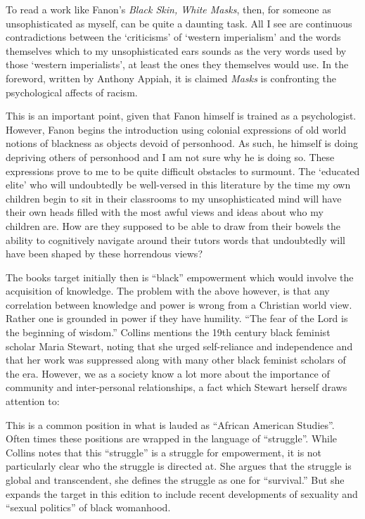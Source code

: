 \documentclass[
  letterpaper,
  DIV=11,
  numbers=noendperiod]{scrreprt}
\begin{document}
\begin{tcolorbox}[enhanced jigsaw, arc=.35mm, breakable, rightrule=.15mm, colback=white, colframe=quarto-callout-important-color-frame, bottomrule=.15mm, leftrule=.75mm, opacityback=0, toprule=.15mm, left=2mm]
\begin{tcolorbox}[enhanced jigsaw, arc=.35mm, breakable, rightrule=.15mm, colback=white, colframe=quarto-callout-tip-color-frame, bottomrule=.15mm, leftrule=.75mm, opacityback=0, toprule=.15mm, left=2mm]
To read a work like Fanon's \emph{Black Skin, White Masks}, then, for
someone as unsophisticated as myself, can be quite a daunting task. All
I see are continuous contradictions between the `criticisms' of `western
imperialism' and the words themselves which to my unsophisticated ears
sounds as the very words used by those `western imperialists', at least
the ones they themselves would use. In the foreword, written by Anthony
Appiah, it is claimed \emph{Masks} is confronting the psychological
affects of racism.

This is an important point, given that Fanon himself is trained as a
psychologist. However, Fanon begins the introduction using colonial
expressions of old world notions of blackness as objects devoid of
personhood. As such, he himself is doing depriving others of personhood
and I am not sure why he is doing so. These expressions prove to me to
be quite difficult obstacles to surmount. The `educated elite' who will
undoubtedly be well-versed in this literature by the time my own
children begin to sit in their classrooms to my unsophisticated mind
will have their own heads filled with the most awful views and ideas
about who my children are. How are they supposed to be able to draw from
their bowels the ability to cognitively navigate around their tutors
words that undoubtedly will have been shaped by these horrendous views?

The books target initially then is ``black'' empowerment which would
involve the acquisition of knowledge. The problem with the above
however, is that any correlation between knowledge and power is wrong
from a Christian world view. Rather one is grounded in power if they
have humility. ``The fear of the Lord is the beginning of wisdom.''
Collins mentions the 19th century black feminist scholar Maria Stewart,
noting that she urged self-reliance and independence and that her work
was suppressed along with many other black feminist scholars of the era.
However, we as a society know a lot more about the importance of
community and inter-personal relationships, a fact which Stewart herself
draws attention to:

This is a common position in what is lauded as ``African American
Studies''. Often times these positions are wrapped in the language of
``struggle''. While Collins notes that this ``struggle'' is a struggle
for empowerment, it is not particularly clear who the struggle is
directed at. She argues that the struggle is global and transcendent,
she defines the struggle as one for ``survival.'' But she expands the
target in this edition to include recent developments of sexuality and
``sexual politics'' of black womanhood.


\end{tcolorbox}
\end{tcolorbox}
\end{document}
